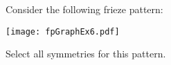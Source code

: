 \documentclass{ximera}
\author{Bart Snapp}
\begin{document}
\begin{exercise}
  Consider the following frieze pattern:
  \begin{image}
  \texttt{[image: fpGraphEx6.pdf]}
  \end{image}
  Select all symmetries for this pattern.
  \begin{selectAll}
  \end{selectAll}
\end{exercise}
\end{document}
